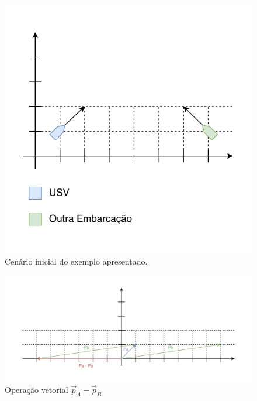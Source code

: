         \begin{figure}[H]
            \centering
            \includegraphics{fig/chap2/cpa_example_scenario.pdf}
            \caption{Cenário inicial do exemplo apresentado.}
            \label{fig:chap2_scenario}
        \end{figure}
        
        \begin{figure}
            \centering
            \includegraphics{fig/chap2/cpa_explanation_pa_pb.pdf}
            \caption{Operação vetorial $\vec{p}_{A}-\vec{p}_{B}$}
            \label{fig:chap2_pa_pb}
        \end{figure}
        
